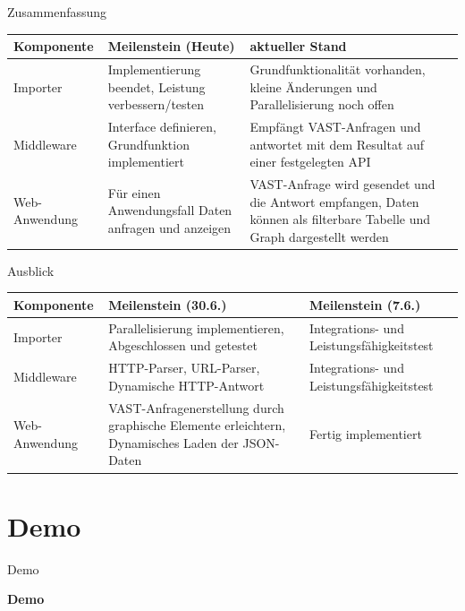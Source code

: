 \documentclass[9pt]{beamer}
\begin{document}
\begin{frame}{Zusammenfassung}

	\begin{table}[h!]
	\centering
	\begin{tabular}{p{5em} p{12em} p{12em}}
		\textbf{Komponente} & \textbf{Meilenstein (Heute)} & \textbf{aktueller Stand} \\ \midrule
		Importer & Implementierung beendet, Leistung verbessern/testen & Grundfunktionalität vorhanden, kleine Änderungen und Parallelisierung noch offen \\ \midrule
		Middleware & Interface definieren, Grundfunktion implementiert & Empfängt VAST-Anfragen und antwortet mit dem Resultat auf einer festgelegten API \\ \midrule
		Web-Anwendung & Für einen Anwendungsfall Daten anfragen und anzeigen & VAST-Anfrage wird gesendet und die Antwort empfangen, Daten können als filterbare Tabelle und Graph dargestellt werden \\ \bottomrule
	\end{tabular}
	\end{table}
\end{frame}

\begin{frame}{Ausblick}
	\begin{table}[h!]
	\centering
	\begin{tabular}{p{5em} p{12em} p{12em}}
		\textbf{Komponente} & \textbf{Meilenstein (30.6.)} & \textbf{Meilenstein (7.6.)} \\ \midrule
		Importer & Parallelisierung implementieren, Abgeschlossen und getestet & Integrations- und Leistungsfähigkeitstest \\ \midrule
		Middleware & HTTP-Parser, URL-Parser, Dynamische HTTP-Antwort	& Integrations- und Leistungsfähigkeitstest \\ \midrule
		Web-Anwendung &  VAST-Anfragenerstellung durch graphische Elemente erleichtern, Dynamisches Laden der JSON-Daten & Fertig implementiert \\ \bottomrule
	\end{tabular}
	\end{table}
\end{frame}

\section{Demo}

\begin{frame}{Demo}
		\begin{center}
			\LARGE \textbf{Demo}
		\end{center}

\end{frame}
\end{document}
